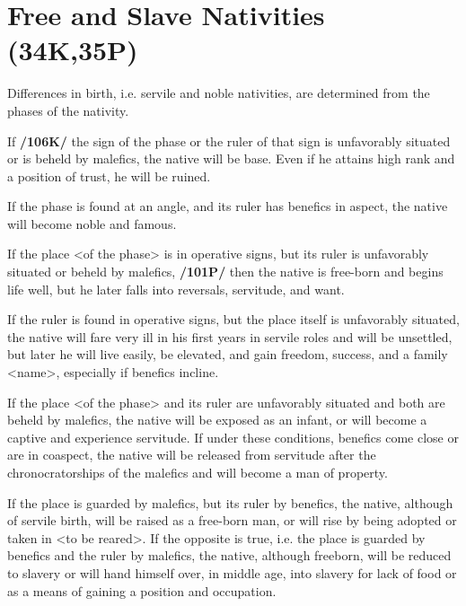 \section{Free and Slave Nativities (34K,35P)}

Differences in birth, i.e. servile and noble nativities, are determined from the phases of the nativity.

If \textbf{/106K/} the sign of the phase or the ruler of that sign is unfavorably situated or is beheld by malefics, the
native will be base. Even if he attains high rank and a position of trust, he will be ruined. 

If the phase is found at an angle, and its ruler has benefics in aspect, the native will become noble and famous. 

If the place <of the phase> is in operative signs, but its ruler is unfavorably situated or beheld by malefics, \textbf{/101P/} then the native is free-born and begins life well, but he later falls into reversals, servitude, and want. 

If the ruler is found in operative signs, but the place itself is unfavorably situated, the native will fare very ill in his
first years in servile roles and will be unsettled, but later he will live easily, be elevated, and gain freedom, success, and a family <name>, especially if benefics incline. 

If the place <of the phase> and its ruler are unfavorably situated and both are beheld by malefics, the native will be exposed as an infant, or will become a captive and experience servitude. If under these conditions, benefics come close or are in coaspect, the native will be released from servitude after the chronocratorships of the malefics and will become
a man of property. 

If the place is guarded by malefics, but its ruler by benefics, the native, although of servile birth, will be raised as a free-born man, or will rise by being adopted or taken in <to be reared>. If the opposite is true, i.e. the place is guarded by benefics and the ruler by malefics, the native, although freeborn, will be reduced to slavery or will hand himself over, in middle age, into slavery for lack of food or as a means of gaining a position and occupation.

\newpage